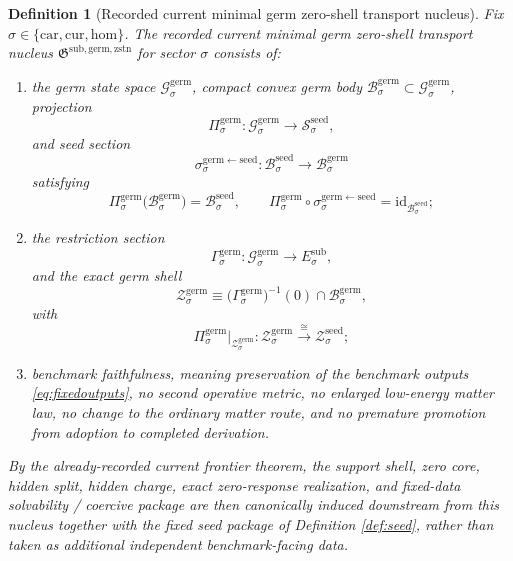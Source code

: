\documentclass[11pt]{article}
\newcommand{\Car}{\mathrm{car}}
\newcommand{\Cur}{\mathrm{cur}}
\newcommand{\Hom}{\mathrm{hom}}
\newcommand{\SubTarget}[1]{E_{#1}^{\mathrm{sub}}}
\newcommand{\SeedState}[1]{\mathcal S_{#1}^{\mathrm{seed}}}
\newcommand{\SeedBody}[1]{\mathcal B_{#1}^{\mathrm{seed}}}
\newcommand{\SeedShell}[1]{\mathcal Z_{#1}^{\mathrm{seed}}}
\newcommand{\GermNucleus}{\mathfrak G^{\mathrm{sub,germ,zstn}}}
\newcommand{\GermState}[1]{\mathcal G_{#1}^{\mathrm{germ}}}
\newcommand{\GermBody}[1]{\mathcal B_{#1}^{\mathrm{germ}}}
\newcommand{\GermProj}[1]{\Pi_{#1}^{\mathrm{germ}}}
\newcommand{\GermSeedSec}[1]{\sigma_{#1}^{\mathrm{germ\leftarrow seed}}}
\newcommand{\GermSection}[1]{\Gamma_{#1}^{\mathrm{germ}}}
\newcommand{\GermShell}[1]{\mathcal Z_{#1}^{\mathrm{germ}}}
\newtheorem{definition}{Definition}
\begin{document}
\begin{definition}[Recorded current minimal germ zero-shell transport nucleus]
\label{def:nucleus}
Fix \(\sigma\in\{\Car,\Cur,\Hom\}\). The recorded current minimal germ zero-shell transport nucleus \(\GermNucleus\) for sector \(\sigma\) consists of:
\begin{enumerate}
    \item the germ state space \(\GermState{\sigma}\), compact convex germ body \(\GermBody{\sigma}\subset\GermState{\sigma}\), projection
    \[
    \GermProj{\sigma}:\GermState{\sigma}\to\SeedState{\sigma},
    \]
    and seed section
    \[
    \GermSeedSec{\sigma}:\SeedBody{\sigma}\to\GermBody{\sigma}
    \]
    satisfying
    \[
    \GermProj{\sigma}\bigl(\GermBody{\sigma}\bigr)=\SeedBody{\sigma},
    \qquad
    \GermProj{\sigma}\circ\GermSeedSec{\sigma}
    =
    \mathrm{id}_{\SeedBody{\sigma}};
    \]
    \item the restriction section
    \[
    \GermSection{\sigma}:\GermState{\sigma}\to\SubTarget{\sigma},
    \]
    and the exact germ shell
    \[
    \GermShell{\sigma}
    \equiv
    \bigl(\GermSection{\sigma}\bigr)^{-1}(0)\cap\GermBody{\sigma},
    \]
    with
    \[
    \GermProj{\sigma}\big|_{\GermShell{\sigma}}
    :
    \GermShell{\sigma}
    \xrightarrow{\cong}
    \SeedShell{\sigma};
    \]
    \item benchmark faithfulness, meaning preservation of the benchmark outputs \eqref{eq:fixedoutputs}, no second operative metric, no enlarged low-energy matter law, no change to the ordinary matter route, and no premature promotion from adoption to completed derivation.
\end{enumerate}
By the already-recorded current frontier theorem, the support shell, zero core, hidden split, hidden charge, exact zero-response realization, and fixed-data solvability / coercive package are then canonically induced downstream from this nucleus together with the fixed seed package of Definition \ref{def:seed}, rather than taken as additional independent benchmark-facing data.
\end{definition}
\end{document}
